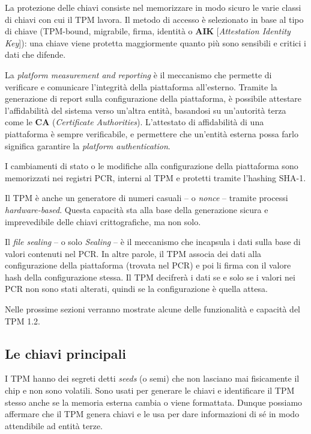 La protezione delle chiavi consiste nel memorizzare in modo sicuro le varie classi di chiavi con cui il TPM lavora. Il metodo di accesso è selezionato in base al tipo di chiave (TPM-bound, migrabile, firma, identità o \textbf{AIK} [\textit{Attestation Identity Key}]): una chiave viene protetta maggiormente quanto più sono sensibili e critici i dati che difende.

La \textit{platform measurement and reporting} è il meccanismo che permette di verificare e comunicare l'integrità della piattaforma all’esterno. Tramite la generazione di report sulla configurazione della piattaforma, è possibile attestare l’affidabilità del sistema verso un’altra entità, basandosi su un’autorità terza come le \textbf{CA} (\textit{Certificate Authorities}). L’attestato di affidabilità di una piattaforma è sempre verificabile, e permettere che un’entità esterna possa farlo significa garantire la \textit{platform authentication}. 

I cambiamenti di stato o le modifiche alla configurazione della piattaforma sono memorizzati nei registri PCR, interni al TPM e protetti tramite l’hashing SHA-1.

Il TPM è anche un generatore di numeri casuali -- o \textit{nonce} -- tramite processi \textit{hardware-based}. Questa capacità sta alla base della generazione sicura e imprevedibile delle chiavi crittografiche, ma non solo.

Il \textit{file sealing} -- o solo \textit{Sealing} -- è il meccanismo che incapsula i dati sulla base di valori contenuti nel PCR. In altre parole, il TPM associa dei dati alla configurazione della piattaforma (trovata nel PCR) e poi li firma con il valore hash della configurazione stessa. Il TPM decifrerà i dati se e solo se i valori nei PCR non sono stati alterati, quindi se la configurazione è quella attesa.

Nelle prossime sezioni verranno mostrate alcune delle funzionalità e capacità del TPM 1.2.

\subsection{Le chiavi principali}
I TPM hanno dei segreti detti \textit{seeds} (o semi) che non lasciano mai fisicamente il chip e non sono volatili. Sono usati per generare le chiavi e identificare il TPM stesso anche se la memoria esterna cambia o viene formattata. Dunque possiamo affermare che il TPM genera chiavi e le usa per dare informazioni di sé in modo attendibile ad entità terze. 

